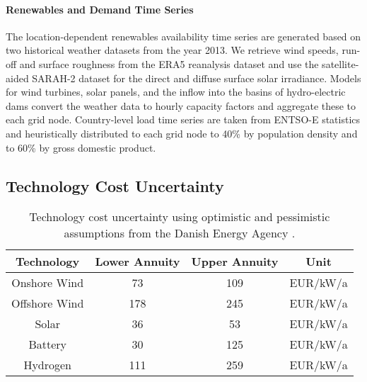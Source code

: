 
\paragraph{Renewables and Demand Time Series}
The location-dependent renewables availability time series are generated
based on two historical weather datasets from the year 2013.
We retrieve wind speeds, run-off and surface roughness from the ERA5 reanalysis dataset and
use the satellite-aided SARAH-2 dataset for the direct and diffuse surface solar irradiance.
Models for wind turbines, solar panels, and the inflow into the basins of hydro-electric dams
convert the weather data to hourly capacity factors and aggregate these to each grid node.
Country-level load time series are taken from ENTSO-E statistics and
heuristically distributed to each grid node to 40\% by population density and to 60\% by gross domestic product.

\subsection{Technology Cost Uncertainty}
\label{sec:uncertainty}

\begin{SCtable}
    \begin{small}
        \begin{tabular}{cccc}
            \toprule
            Technology & Lower Annuity & Upper Annuity & Unit  \\ \midrule
            Onshore Wind & 73 & 109 & EUR/kW/a \\
            Offshore Wind & 178 & 245 & EUR/kW/a \\ %
            Solar & 36 & 53 & EUR/kW/a \\
            Battery & 30 & 125 & EUR/kW/a \\
            Hydrogen & 111 & 259 & EUR/kW/a \\ \bottomrule
        \end{tabular}
    \end{small}
    \caption[Technology Cost Uncertainty]{Technology cost uncertainty using optimistic and pessimistic assumptions from the Danish Energy Agency \cite{DEA}.}
    \label{tab:costuncertainty}
\end{SCtable}   


